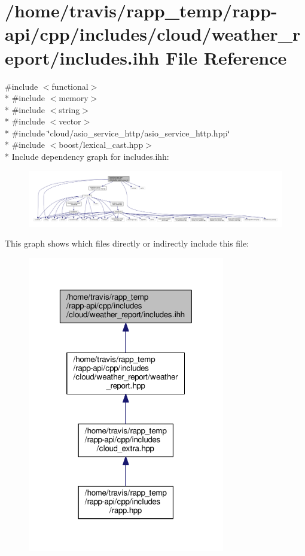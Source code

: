 \hypertarget{cloud_2weather__report_2includes_8ihh}{\section{/home/travis/rapp\-\_\-temp/rapp-\/api/cpp/includes/cloud/weather\-\_\-report/includes.ihh File Reference}
\label{cloud_2weather__report_2includes_8ihh}
}
{\ttfamily \#include $<$functional$>$}\\*
{\ttfamily \#include $<$memory$>$}\\*
{\ttfamily \#include $<$string$>$}\\*
{\ttfamily \#include $<$vector$>$}\\*
{\ttfamily \#include \char`\"{}cloud/asio\-\_\-service\-\_\-http/asio\-\_\-service\-\_\-http.\-hpp\char`\"{}}\\*
{\ttfamily \#include $<$boost/lexical\-\_\-cast.\-hpp$>$}\\*
Include dependency graph for includes.\-ihh\-:
\nopagebreak
\begin{figure}[H]
\begin{center}
\leavevmode
\includegraphics[width=350pt]{cloud_2weather__report_2includes_8ihh__incl}
\end{center}
\end{figure}
This graph shows which files directly or indirectly include this file\-:
\nopagebreak
\begin{figure}[H]
\begin{center}
\leavevmode
\includegraphics[width=244pt]{cloud_2weather__report_2includes_8ihh__dep__incl}
\end{center}
\end{figure}
